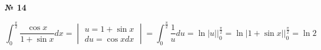\documentclass{article}
\begin{document}
\textbf{№ 14} 

$$ \int_{0}^{\frac{\pi}{2}} \frac{\cos{x}}{1+\sin{x}} dx 
 = \begin{vmatrix}  u  = 1+\sin{x} \\ 
                    du = \cos{x} dx \end{vmatrix}
= \int_{0}^{\frac{\pi}{2}} \frac{1}{u} du
= \ln{\left| u \right|} \bigg\vert_{0}^{\frac{\pi}{2}} 
= \ln{\left| 1+\sin{x} \right|} \bigg\vert_{0}^{\frac{\pi}{2}}
= \ln{2}$$
\end{document}

